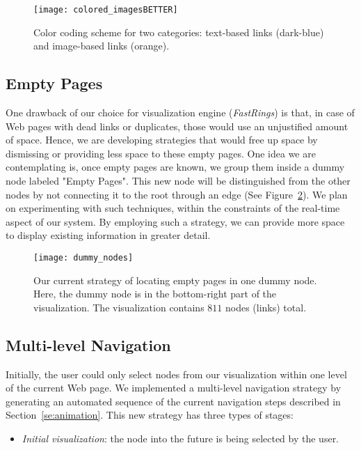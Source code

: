 \documentclass[10pt,psfig]{article}
\begin{document}
{\begin{figure}[t]
\centering
\texttt{[image: colored\_imagesBETTER]}
\caption{Color coding scheme for two categories: text-based links (dark-blue) and image-based links (orange).}
\label{fig_color_nodes}
\end{figure}

\subsection{Empty Pages}
\label{ss:empty_pages}

One drawback of our choice for visualization engine ({\em FastRings}) is that, in case of Web pages with dead links or duplicates, those would use an unjustified amount of space.
Hence, we are developing strategies that would free up space by dismissing or providing less space to these empty pages.
One idea we are contemplating is, once empty pages are known, we group them inside a dummy node labeled "Empty Pages".
This new node will be distinguished from the other nodes by not connecting it to the root through an edge (See Figure~\ref{fig_dummy}).
We plan on experimenting with such techniques, within the constraints of the real-time aspect of our system.
By employing such a strategy, we can provide more space to display existing information in greater detail.

\begin{figure}[tb]
\centering
\texttt{[image: dummy\_nodes]}
\caption{Our current strategy of locating empty pages in one dummy node. Here, the dummy node is in the bottom-right part of the visualization.
The visualization contains $811$ nodes (links) total.}
\label{fig_dummy}
\end{figure}

\subsection{Multi-level Navigation}
\label{ss:multi-level}

Initially, the user could only select nodes from our visualization within one level of the current Web page.
We implemented a multi-level navigation strategy by generating an automated sequence of the current navigation steps described in Section~\ref{se:animation}.
This new strategy has three types of stages:

\begin{itemize}

\item {\em Initial visualization}: the node into the future is being selected by the user.


\end{itemize}}
\end{document}

